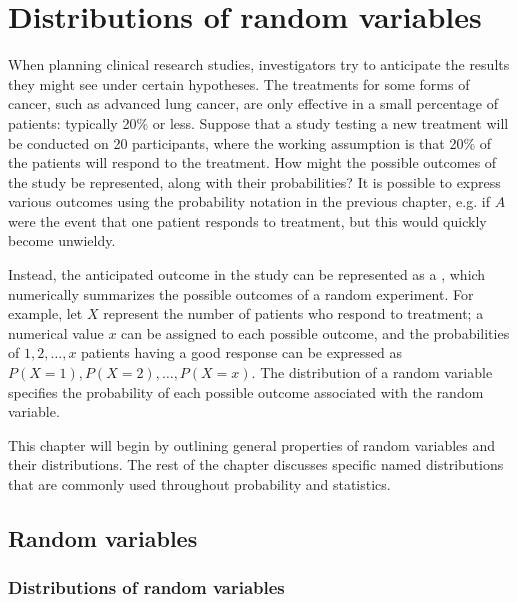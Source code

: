 



\chapter{Distributions of random variables}
\label{modeling}


When planning clinical research studies, investigators try to anticipate the results they might see under certain hypotheses. The treatments for some forms of cancer, such as advanced lung cancer, are only effective in a small percentage of patients: typically 20\% or less. Suppose that a study testing a new treatment will be conducted on 20 participants, where the working assumption is that 20\% of the patients will respond to the treatment. How might the possible outcomes of the study be represented, along with their probabilities? It is possible to express various outcomes using the probability notation in the previous chapter, e.g. if $A$ were the event that one patient responds to treatment, but this would quickly become unwieldy.

Instead, the anticipated outcome in the study can be represented as a , which numerically summarizes the possible outcomes of a random experiment. For example, let $X$ represent the number of patients who respond to treatment; a numerical value $x$ can be assigned to each possible outcome, and the probabilities of $1, 2, \dots, x$ patients having a good response can be expressed as $P(X = 1), P(X = 2), \dots , P(X = x)$. The distribution of a random variable specifies the probability of each possible outcome associated with the random variable. 

This chapter will begin by outlining general properties of random variables and their distributions. The rest of the chapter discusses specific named distributions that are commonly used throughout probability and statistics.

\section{Random variables}
\label{randomVariablesSection}


\subsection{Distributions of random variables}

